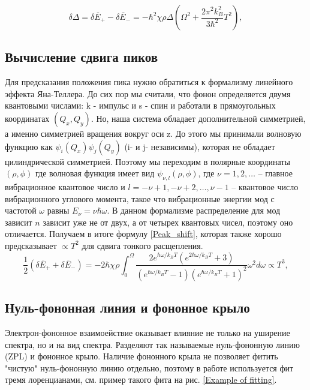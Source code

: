 \begin{equation}
    \label{Shift}
    \delta \Delta = \overline{\delta E_{+}} - \overline{\delta E_{-}} = -\hbar^2 
    \chi \rho \Delta \left( \Omega^2 + \frac{2\pi^2 k_B^2}{3\hbar^2}T^2 \right),
\end{equation}
    

\subsection{Вычисление сдвига пиков}
Для предсказания положения пика нужно обратиться к формализму линейного 
эффекта Яна-Теллера. До сих пор мы считали, что фонон определяется двумя
квантовыми числами: k - импульс и s - спин и работали в прямоугольных 
координатах $(Q_x,Q_y)$. Но, наша система обладает дополнительной симметрией,
а именно симметрией вращения вокруг оси z. До этого мы принимали волновую
функцию как $\psi_i(Q_x)\psi_j(Q_y)$ (i- и j- независимы), которая не обладает 
цилиндрической симметрией. Поэтому мы переходим в полярные координаты 
$(\rho, \phi)$ где волновая функция имеет вид $\psi_{\nu, l}(\rho, \phi)$, 
где $\nu = 1, 2, \dots$ -- главное вибрационное квантовое число и
$l = -\nu + 1, -\nu + 2, \dots, \nu - 1$ -- квантовое число вибрационного
углового момента, такое что вибрационные энергии мод с частотой $\omega$
равны $E_{\nu} = \nu\hbar\omega$. В данном формализме распределение
для мод зависит $n$ зависит уже не от двух, а от четырех квантовых чисел,
поэтому оно отличается. Получаем в итоге формулу \ref{Peak_shift},
которая также хорошо предсказывает $\propto T^2$ для сдвига тонкого расщепления.
\begin{equation}
    \label{Peak_shift}
    \frac{1}{2} \left( \overline{\delta E_+} + \overline{\delta E_-} \right) 
    = -2 \hbar \chi \rho \int_0^\Omega \frac{2e^{\hbar \omega / k_B T} 
    \left( e^{2\hbar \omega / k_B T} + 3 \right)}{\left( e^{\hbar \omega / k_B T} 
    - 1 \right) \left( e^{\hbar \omega / k_B T} + 1 \right)^2} \omega^2 d\omega \propto T^3,
\end{equation}

\subsection{Нуль-фононная линия и фононное крыло}
Электрон-фононное взаимоействие оказывает влияние не только на уширение спектра, но 
и на вид спектра. Разделяют так называемые нуль-фононную линию (ZPL) и фононное крыло.
Наличие фононного крыла не позволяет фитить "чистую" нуль-фононную линию отдельно, поэтому
в работе используется фит тремя лоренцианами, см. пример такого фита на рис. \ref{Example of fitting}.



